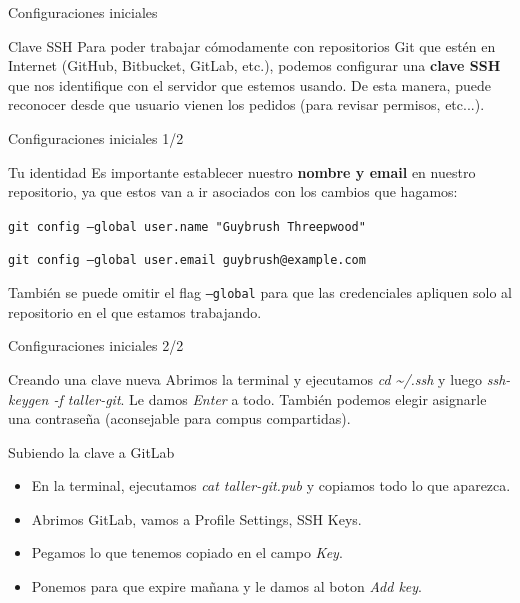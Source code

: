 \begin{frame}[fragile]{Configuraciones iniciales}

	\begin{block}{Clave SSH}
		Para poder trabajar cómodamente con repositorios Git que estén en Internet (GitHub, Bitbucket, GitLab, etc.), podemos configurar una \textbf{clave SSH} que nos identifique con el servidor que estemos usando. De esta manera, puede reconocer desde que usuario vienen los pedidos (para revisar permisos, etc...).

	\end{block}
\end{frame}

\begin{frame}[fragile]{Configuraciones iniciales 1/2}

    \begin{block}{Tu identidad}
        Es importante establecer nuestro \textbf{nombre y email} en nuestro repositorio, ya que estos van a ir asociados con los cambios que hagamos:

        \vspace{0.5em}

        \texttt{git config --global user.name "Guybrush Threepwood"}

        \texttt{git config --global user.email guybrush@example.com}

    También se puede omitir el flag \texttt{--global} para que las credenciales apliquen solo al repositorio en el que estamos trabajando.
        \end{block}
\end{frame}

\begin{frame}{Configuraciones iniciales 2/2}
  \begin{block}{Creando una clave nueva}
		Abrimos la terminal y ejecutamos \textit{cd \textasciitilde/.ssh} y luego \textit{ssh-keygen -f taller-git}. Le damos \textit{Enter} a todo. También podemos elegir asignarle una contraseña (aconsejable para compus compartidas).
	\end{block}
  \pause
  \begin{block}{Subiendo la clave a GitLab}
		\begin{itemize}
		\item En la terminal, ejecutamos \textit{cat taller-git.pub} y copiamos todo lo que aparezca.
      \item Abrimos GitLab, vamos a Profile Settings, SSH Keys.
      \item Pegamos lo que tenemos copiado en el campo \textit{Key}.
      \item Ponemos para que expire mañana y le damos al boton \textit{Add key}.
		\end{itemize}
	\end{block}
\end{frame}

